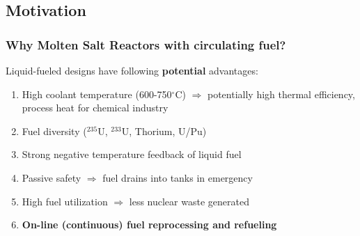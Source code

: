 \subsection{Motivation}


\begin{frame}
\frametitle{Why Molten Salt Reactors with circulating fuel?}
\begin{block}{Liquid-fueled  
		designs have following \textbf{potential} advantages:}
	\begin{enumerate}
		\itemsep1em
		\item High coolant temperature (600-750$^{\circ}$C) 
		$\Rightarrow$ potentially high thermal efficiency, process 
		heat for chemical industry
		\item Fuel diversity ($^{235}$U, $^{233}$U, Thorium, U/Pu)
		\item Strong negative temperature feedback of liquid fuel
		\item Passive safety $\Rightarrow$ fuel drains into tanks 
		in emergency
		\item High fuel utilization $\Rightarrow$ less nuclear 
		waste generated
		\item<2> \textbf{On-line (continuous) fuel reprocessing and refueling}
	\end{enumerate}
\end{block}

\end{frame}


